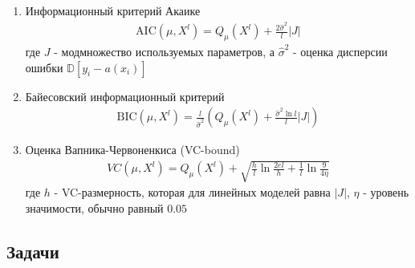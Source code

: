\begin{enumerate}
    \item Информационный критерий Акаике
          \begin{align*}
              \text{AIC}(\mu, X^l) = Q_{\mu}(X^l) + \frac{2\hat{\sigma}^2}{l}|J|
          \end{align*}
          где $J$ - модмножество используемых параметров, а $\hat{\sigma}^2$ - оценка дисперсии ошибки $\mathbb{D}[y_i - a(x_i)]$
    \item Байесовский информационный критерий
          \begin{align*}
              \text{BIC}(\mu, X^l) = \frac{l}{\hat{\sigma}^2}\left(Q_{\mu}(X^l) + \frac{\hat{\sigma}^2\ln{l}}{l}|J|\right)
          \end{align*}
    \item Оценка Вапника-Червоненкиса (VC-bound)
          \begin{align*}
              VC(\mu, X^l) = Q_{\mu}(X^l) + \sqrt{\frac{h}{l}\ln{\frac{2el}{h}} + \frac{1}{l}\ln{\frac{9}{4\eta}}}
          \end{align*}
          где $h$ - VC-размерность, которая для линейных моделей равна $|J|$, $\eta$ - уровень значимости, обычно равный $0.05$
\end{enumerate}

\subsection*{Задачи}

